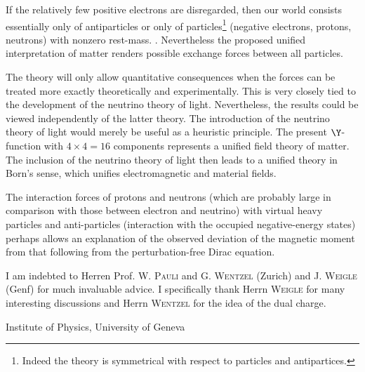 \documentclass{article}
\begin{document}
If the relatively few positive electrons are disregarded, then our world consists essentially only of antiparticles or only of particles\footnote{Indeed the theory is symmetrical with respect to particles and antipartices.} (negative electrons, protons, neutrons) with nonzero rest-mass. . Nevertheless the proposed unified interpretation of matter renders possible exchange forces between all  particles.

The theory will only allow quantitative consequences when the forces can be treated more exactly theoretically and experimentally. This is very closely tied to the development of the neutrino theory of light. Nevertheless, the  results could be viewed independently of the latter theory. The introduction of the neutrino theory of light would merely be useful as a heuristic principle. The present $\Y$-function with $4 \times 4 = 16$ components represents a unified field theory of matter. The inclusion of the neutrino theory of light then leads to a unified theory in Born's sense, which unifies electromagnetic and material fields.

The interaction forces of protons and neutrons (which are probably large in comparison with those between electron and neutrino) with virtual heavy particles and anti-particles (interaction with the occupied negative-energy states) perhaps allows an explanation of the observed deviation of the magnetic moment from that following from the perturbation-free Dirac equation.

I am indebted to Herren Prof. W. \textsc{Pauli} and G. \textsc{Wentzel} (Zurich) and J. \textsc{Weigle} (Genf) for much invaluable advice. I specifically thank Herrn \textsc{Weigle} for many interesting discussions and Herrn \textsc{Wentzel} for the idea of the dual charge.

Institute of Physics, University of Geneva

 
\end{document}
